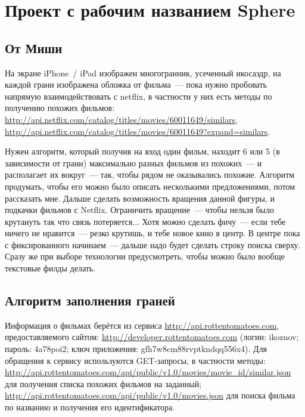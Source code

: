 \documentclass[oneside,final,14pt]{extreport}
\begin{document}
\tableofcontents

\chapter{Проект с рабочим названием Sphere}

\section{От Миши}

На экране iPhone~/ iPad изображен многогранник, усеченный икосаэдр, на каждой грани изображена обложка от фильма~--- пока нужно пробовать напрямую взаимодействовать с netflix, в частности у них есть методы по получению похожих фильмов: \\
\url{http://api.netflix.com/catalog/titles/movies/60011649/similars}, \\
\url{http://api.netflix.com/catalog/titles/movies/60011649?expand=similars}.

Нужен алгоритм, который получив на вход один фильм, находит 6 или 5 (в зависимости от грани) максимально разных фильмов из похожих~--- и располагает их вокруг~--- так, чтобы рядом не оказывались похожие. Алгоритм продумать, чтобы его можно было описать несколькими предложениями, потом рассказать мне. Дальше сделать возможность вращения данной фигуры, и подкачки фильмов с Netflix. Ограничить вращение~--- чтобы нельзя было крутануть так что связь потеряется... Хотя можно сделать фичу~--- если тебе ничего не нравится~--- резко крутишь, и тебе новое кино в центр. В центре пока с фиксированного начинаем~--- дальше надо будет сделать строку поиска сверху. Сразу же при выборе технологии предусмотреть, чтобы можно было вообще текстовые филды делать.

\section{Алгоритм заполнения граней}
	
Информация о фильмах берётся из сервиса \url{http://api.rottentomatoes.com}, предоставляемого сайтом: \url{http://developer.rottentomatoes.com} (логин: ikoznov; пароль: 4a78poi2; ключ приложения: gfh7w8cm88rvptkndqq556x4). Для обращения к сервису используются GET-запросы, в частности методы: \\
\url{http://api.rottentomatoes.com/api/public/v1.0/movies/movie_id/similar.json} для получения списка похожих фильмов на заданный; \\
\url{http://api.rottentomatoes.com/api/public/v1.0/movies.json} для поиска фильма по названию и получения его идентификатора.
\end{document}
